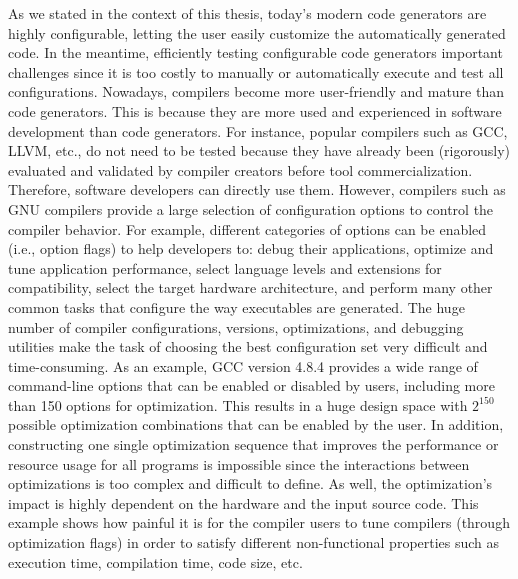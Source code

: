 As we stated in the context of this thesis, today's modern code generators are highly configurable, letting the user  easily customize the automatically generated code. In the meantime, efficiently testing configurable code generators  important challenges since it is too costly to manually or automatically execute and test all configurations. 
Nowadays, compilers become more user-friendly and mature than code generators\cite{fursin2008milepost}. This is because they are more used and experienced in software development than code generators. For instance, popular compilers such as GCC, LLVM, etc., do not need to be tested because they have already been (rigorously) evaluated and validated by compiler creators before tool commercialization. Therefore, software developers can directly use them.
However, compilers such as GNU compilers provide a large selection of configuration options to control the compiler behavior. 
For example, different categories of options can be enabled (i.e., option flags) to help developers to: debug their applications, optimize and tune application performance, select language levels and extensions for compatibility, select the target hardware architecture, and perform many other common tasks that configure the way executables are generated.
The huge number of compiler configurations, versions, optimizations, and debugging utilities make the task of choosing the best configuration set very difficult and time-consuming. As an example, GCC version 4.8.4 provides a wide range of command-line options that can be enabled or disabled by users, including more than 150 options for optimization. This results in a huge design space with $2^{150}$ possible optimization combinations that can be enabled by the user. In addition, constructing one single optimization sequence that improves the performance or resource usage for all programs is impossible since the interactions between optimizations is too complex and difficult to define. As well, the optimization's impact is highly dependent on the hardware and the input source code.
This example shows how painful it is for the compiler users to tune compilers (through optimization flags) in order to satisfy different non-functional properties such as execution time, compilation time, code size, etc.


